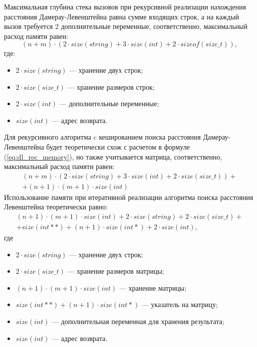 Максимальная глубина стека вызовов при рекурсивной реализации нахождения расстояния Дамерау-Левенштейна равна сумме входящих строк, а на каждый вызов требуется 2 дополнительные переменные, соответственно, максимальный расход памяти равен:
\begin{equation}
	\label{eq:dl_rec_memory}
	(n + m) \cdot (2 \cdot size(string) + 3 \cdot size(int) + 2 \cdot sizeof(size\_t)),
\end{equation}
где:
\begin{itemize}
	\item $2 \cdot size(string)$ --- хранение двух строк;
	\item $2 \cdot size(size\_t)$ --- хранение размеров строк;
	\item $2 \cdot size(int)$ --- дополнительные переменные;
	\item $size(int)$ --- адрес возврата.
\end{itemize}

Для рекурсивного алгоритма c кешированием поиска расстояния Дамерау-Левенштейна будет теоретически схож с расчетом в формуле (\ref{eq:dl_rec_memory}), но также учитывается матрица, соответственно, максимальный расход памяти равен:
\begin{equation}
	\label{eq:dl_hash_memory}
	\begin{aligned}
		(n + m) \cdot (2 \cdot size(string) + 3 \cdot size(int) + 2 \cdot size(size\_t)) + \\
		+ (n + 1) \cdot (m + 1) \cdot size(int)
	\end{aligned}
\end{equation}
Использование памяти при итеративной реализации алгоритма поиска расстояния Левенштейна теоретически равно:
\begin{equation}
	\label{eq:lev_mtr_memory}
	\begin{aligned}
		(n + 1) \cdot (m + 1) \cdot size(int) + 2 \cdot size(string) + 2 \cdot size(size\_t) + \\
		+ size(int **) + (n + 1) \cdot size(int *) + 2 \cdot size(int),
	\end{aligned}
\end{equation}
где 
\begin{itemize}
	\item $2 \cdot size(string)$ --- хранение двух строк;
	\item $2 \cdot size(size\_t)$ --- хранение размеров матрицы;
	\item $(n + 1) \cdot (m + 1) \cdot size(int)$ --- хранение матрицы;
	\item $size(int **) + (n + 1) \cdot size(int *)$ --- указатель на матрицу;
	\item $size(int)$ --- дополнительная переменная для хранения результата;
	\item $size(int)$ --- адрес возврата.
\end{itemize}

